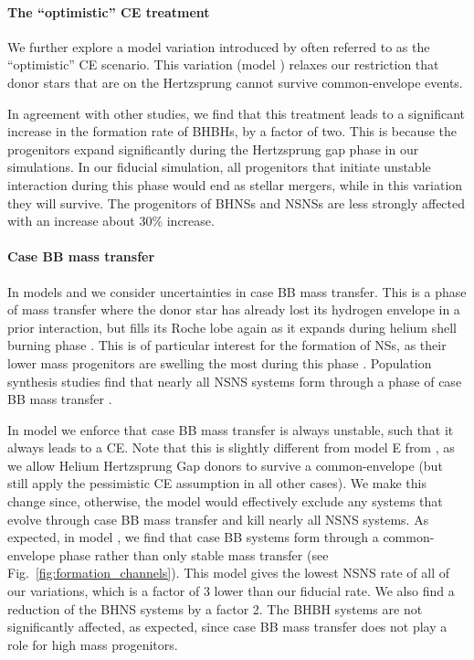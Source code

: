 \paragraph{The ``optimistic'' CE treatment} We further explore a model variation introduced by \citet{Belczynski+2007} often referred to as the ``optimistic'' CE scenario. This variation (model \modOpt{}) relaxes our restriction that donor stars that are on the Hertzsprung cannot survive common-envelope events.

In agreement with other studies, we find that this treatment leads to a significant increase in the formation rate of BHBHs, by a factor of two. This is because the progenitors expand significantly during the Hertzsprung gap phase in our simulations. In our fiducial simulation, all progenitors that initiate unstable interaction during this phase would end as stellar mergers, while in this variation they will survive. The progenitors of BHNSs and NSNSs are less strongly affected with an increase about 30\% increase.

\paragraph{Case BB mass transfer} In models \modCaseBB{} and \modCaseBBOpt{} we consider uncertainties in case BB mass transfer. This is a phase of mass transfer where the donor star has already lost its hydrogen envelope in a prior interaction, but fills its Roche lobe again as it expands during helium shell burning phase \citep[e.g.][]{Dewi+2002, Tauris+2015, Tauris+2017}. This is of particular interest for the formation of NSs, as their lower mass progenitors are swelling the most during this phase \citep[e.g.][and references therein]{Laplace+2020}. Population synthesis studies find that nearly all NSNS systems form through a phase of case BB mass transfer \citep{Vigna-Gomez+2018}.

In model \modCaseBB{} we enforce that case BB mass transfer is always unstable, such that it always leads to a CE. Note that this is slightly different from model E from \citet{Broekgaarden+2021}, as we allow Helium Hertzsprung Gap donors to survive a common-envelope (but still apply the pessimistic CE assumption in all other cases). We make this change since, otherwise, the model would effectively exclude any systems that evolve through case BB mass transfer and kill nearly all NSNS systems. As expected, in model \modCaseBB{}, we find that case BB systems form through a common-envelope phase rather than only stable mass transfer (see Fig.~\ref{fig:formation_channels}). This model gives the lowest NSNS rate of all of our variations, which is a factor of 3 lower than our fiducial rate. We also find a reduction of the BHNS systems by a factor 2. The BHBH systems are not significantly affected, as expected, since case BB mass transfer does not play a role for high mass progenitors.

